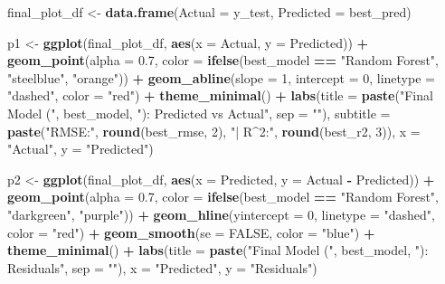 \documentclass[
]{article}
\newenvironment{Shaded}{\begin{snugshade}}{\end{snugshade}}
\newcommand{\AttributeTok}[1]{\textcolor[rgb]{0.13,0.29,0.53}{#1}}
\newcommand{\ConstantTok}[1]{\textcolor[rgb]{0.56,0.35,0.01}{#1}}
\newcommand{\DecValTok}[1]{\textcolor[rgb]{0.00,0.00,0.81}{#1}}
\newcommand{\FloatTok}[1]{\textcolor[rgb]{0.00,0.00,0.81}{#1}}
\newcommand{\FunctionTok}[1]{\textcolor[rgb]{0.13,0.29,0.53}{\textbf{#1}}}
\newcommand{\NormalTok}[1]{#1}
\newcommand{\OtherTok}[1]{\textcolor[rgb]{0.56,0.35,0.01}{#1}}
\newcommand{\SpecialCharTok}[1]{\textcolor[rgb]{0.81,0.36,0.00}{\textbf{#1}}}
\newcommand{\StringTok}[1]{\textcolor[rgb]{0.31,0.60,0.02}{#1}}
\begin{document}
\begin{Shaded}
\begin{Highlighting}[]
\NormalTok{final\_plot\_df }\OtherTok{\textless{}{-}} \FunctionTok{data.frame}\NormalTok{(}\AttributeTok{Actual =}\NormalTok{ y\_test, }\AttributeTok{Predicted =}\NormalTok{ best\_pred)}

\NormalTok{p1 }\OtherTok{\textless{}{-}} \FunctionTok{ggplot}\NormalTok{(final\_plot\_df, }\FunctionTok{aes}\NormalTok{(}\AttributeTok{x =}\NormalTok{ Actual, }\AttributeTok{y =}\NormalTok{ Predicted)) }\SpecialCharTok{+}
  \FunctionTok{geom\_point}\NormalTok{(}\AttributeTok{alpha =} \FloatTok{0.7}\NormalTok{, }\AttributeTok{color =} \FunctionTok{ifelse}\NormalTok{(best\_model }\SpecialCharTok{==} \StringTok{"Random Forest"}\NormalTok{, }\StringTok{"steelblue"}\NormalTok{, }\StringTok{"orange"}\NormalTok{)) }\SpecialCharTok{+}
  \FunctionTok{geom\_abline}\NormalTok{(}\AttributeTok{slope =} \DecValTok{1}\NormalTok{, }\AttributeTok{intercept =} \DecValTok{0}\NormalTok{, }\AttributeTok{linetype =} \StringTok{"dashed"}\NormalTok{, }\AttributeTok{color =} \StringTok{"red"}\NormalTok{) }\SpecialCharTok{+}
  \FunctionTok{theme\_minimal}\NormalTok{() }\SpecialCharTok{+}
  \FunctionTok{labs}\NormalTok{(}\AttributeTok{title =} \FunctionTok{paste}\NormalTok{(}\StringTok{"Final Model ("}\NormalTok{, best\_model, }\StringTok{"): Predicted vs Actual"}\NormalTok{, }\AttributeTok{sep =} \StringTok{""}\NormalTok{),}
       \AttributeTok{subtitle =} \FunctionTok{paste}\NormalTok{(}\StringTok{"RMSE:"}\NormalTok{, }\FunctionTok{round}\NormalTok{(best\_rmse, }\DecValTok{2}\NormalTok{), }\StringTok{"| R\^{}2:"}\NormalTok{, }\FunctionTok{round}\NormalTok{(best\_r2, }\DecValTok{3}\NormalTok{)),}
       \AttributeTok{x =} \StringTok{"Actual"}\NormalTok{, }\AttributeTok{y =} \StringTok{"Predicted"}\NormalTok{)}

\NormalTok{p2 }\OtherTok{\textless{}{-}} \FunctionTok{ggplot}\NormalTok{(final\_plot\_df, }\FunctionTok{aes}\NormalTok{(}\AttributeTok{x =}\NormalTok{ Predicted, }\AttributeTok{y =}\NormalTok{ Actual }\SpecialCharTok{{-}}\NormalTok{ Predicted)) }\SpecialCharTok{+}
  \FunctionTok{geom\_point}\NormalTok{(}\AttributeTok{alpha =} \FloatTok{0.7}\NormalTok{, }\AttributeTok{color =} \FunctionTok{ifelse}\NormalTok{(best\_model }\SpecialCharTok{==} \StringTok{"Random Forest"}\NormalTok{, }\StringTok{"darkgreen"}\NormalTok{, }\StringTok{"purple"}\NormalTok{)) }\SpecialCharTok{+}
  \FunctionTok{geom\_hline}\NormalTok{(}\AttributeTok{yintercept =} \DecValTok{0}\NormalTok{, }\AttributeTok{linetype =} \StringTok{"dashed"}\NormalTok{, }\AttributeTok{color =} \StringTok{"red"}\NormalTok{) }\SpecialCharTok{+}
  \FunctionTok{geom\_smooth}\NormalTok{(}\AttributeTok{se =} \ConstantTok{FALSE}\NormalTok{, }\AttributeTok{color =} \StringTok{"blue"}\NormalTok{) }\SpecialCharTok{+}
  \FunctionTok{theme\_minimal}\NormalTok{() }\SpecialCharTok{+}
  \FunctionTok{labs}\NormalTok{(}\AttributeTok{title =} \FunctionTok{paste}\NormalTok{(}\StringTok{"Final Model ("}\NormalTok{, best\_model, }\StringTok{"): Residuals"}\NormalTok{, }\AttributeTok{sep =} \StringTok{""}\NormalTok{),}
       \AttributeTok{x =} \StringTok{"Predicted"}\NormalTok{, }\AttributeTok{y =} \StringTok{"Residuals"}\NormalTok{)}


\end{Highlighting}
\end{Shaded}
\end{document}
